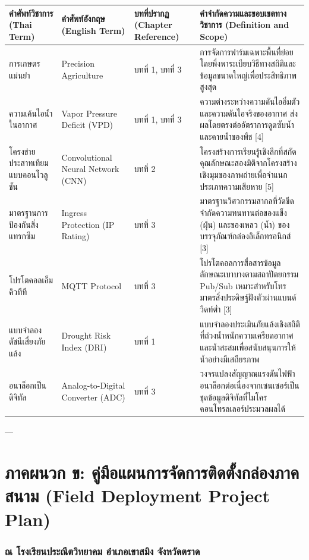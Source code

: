 \documentclass[11pt,a4paper,openany]{report}
\begin{document}
\begin{table}[htbp]
\centering
\begin{tabularx}{\textwidth}{L L L L}
\toprule
คำศัพท์วิชาการ (Thai Term) & คำศัพท์อังกฤษ (English Term) & บทที่ปรากฏ (Chapter Reference) & คำจำกัดความและขอบเขตทางวิชาการ (Definition and Scope) \\
\midrule
การเกษตรแม่นยำ & Precision Agriculture & บทที่ 1, บทที่ 3 & การจัดการฟาร์มเฉพาะพื้นที่ย่อยโดยพึ่งพาระเบียบวิธีทางสถิติและข้อมูลขนาดใหญ่เพื่อประสิทธิภาพสูงสุด \\
ความเค้นไอน้ำในอากาศ & Vapor Pressure Deficit (VPD) & บทที่ 1, บทที่ 3 & ความต่างระหว่างความดันไออิ่มตัวและความดันไอจริงของอากาศ ส่งผลโดยตรงต่ออัตราการดูดซับน้ำและคายน้ำของพืช [4] \\
โครงข่ายประสาทเทียมแบบคอนโวลูชัน & Convolutional Neural Network (CNN) & บทที่ 2 & โครงสร้างการเรียนรู้เชิงลึกที่สกัดคุณลักษณะสองมิติจากโครงสร้างเชิงมุมของภาพถ่ายเพื่อจำแนกประเภทความเสียหาย [5] \\
มาตรฐานการป้องกันสิ่งแทรกซึม & Ingress Protection (IP Rating) & บทที่ 3 & มาตรฐานวิศวกรรมสากลที่วัดขีดจำกัดความทนทานต่อของแข็ง (ฝุ่น) และของเหลว (น้ำ) ของบรรจุภัณฑ์กล่องอิเล็กทรอนิกส์ [3] \\
โปรโตคอลเอ็มคิวทีที & MQTT Protocol & บทที่ 3 & โปรโตคอลการสื่อสารข้อมูลลักษณะเบาบางตามสถาปัตยกรรม Pub/Sub เหมาะสำหรับโทรมาตรสิ่งประดิษฐ์ฝังตัวผ่านแบนด์วิดท์ต่ำ [3] \\
แบบจำลองดัชนีเสี่ยงภัยแล้ง & Drought Risk Index (DRI) & บทที่ 1 & แบบจำลองประเมินภัยแล้งเชิงสถิติที่ถ่วงน้ำหนักความเครียดอากาศและน้ำสะสมเพื่อสนับสนุนการให้น้ำอย่างมีเสถียรภาพ \\
อนาล็อกเป็นดิจิทัล & Analog-to-Digital Converter (ADC) & บทที่ 3 & วงจรแปลงสัญญาณแรงดันไฟฟ้าอนาล็อกต่อเนื่องจากเซนเซอร์เป็นชุดข้อมูลดิจิทัลที่ไมโครคอนโทรลเลอร์ประมวลผลได้ \\
\bottomrule
\end{tabularx}
\end{table}


---

\chapter*{ภาคผนวก ข: คู่มือแผนการจัดการติดตั้งกล่องภาคสนาม (Field Deployment Project Plan)}

\subsection{ณ โรงเรียนประณีตวิทยาคม อำเภอเขาสมิง จังหวัดตราด}
\end{document}
